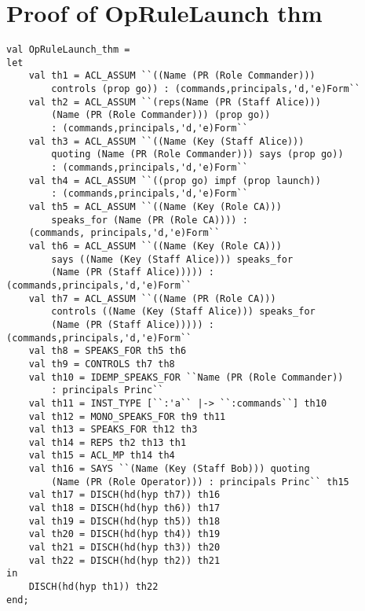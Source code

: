 \documentclass{report}
\begin{document}
\section{Proof of OpRuleLaunch thm}
\label{proof-14-4-1-A}
\begin{lstlisting}[frame=TBlr]
val OpRuleLaunch_thm =
let
	val th1 = ACL_ASSUM ``((Name (PR (Role Commander))) 
        controls (prop go)) : (commands,principals,'d,'e)Form``
	val th2 = ACL_ASSUM ``(reps(Name (PR (Staff Alice))) 
        (Name (PR (Role Commander))) (prop go)) 
        : (commands,principals,'d,'e)Form``
	val th3 = ACL_ASSUM ``((Name (Key (Staff Alice))) 
        quoting (Name (PR (Role Commander))) says (prop go)) 
        : (commands,principals,'d,'e)Form``
	val th4 = ACL_ASSUM ``((prop go) impf (prop launch)) 
        : (commands,principals,'d,'e)Form``
	val th5 = ACL_ASSUM ``((Name (Key (Role CA))) 
        speaks_for (Name (PR (Role CA)))) :
	(commands, principals,'d,'e)Form``
	val th6 = ACL_ASSUM ``((Name (Key (Role CA))) 
        says ((Name (Key (Staff Alice))) speaks_for 
        (Name (PR (Staff Alice))))) : (commands,principals,'d,'e)Form``
	val th7 = ACL_ASSUM ``((Name (PR (Role CA))) 
        controls ((Name (Key (Staff Alice))) speaks_for 
        (Name (PR (Staff Alice))))) : (commands,principals,'d,'e)Form``
	val th8 = SPEAKS_FOR th5 th6
	val th9 = CONTROLS th7 th8
	val th10 = IDEMP_SPEAKS_FOR ``Name (PR (Role Commander)) 
        : principals Princ``
	val th11 = INST_TYPE [``:'a`` |-> ``:commands``] th10
	val th12 = MONO_SPEAKS_FOR th9 th11
	val th13 = SPEAKS_FOR th12 th3
	val th14 = REPS th2 th13 th1
	val th15 = ACL_MP th14 th4
	val th16 = SAYS ``(Name (Key (Staff Bob))) quoting 
        (Name (PR (Role Operator))) : principals Princ`` th15
	val th17 = DISCH(hd(hyp th7)) th16
	val th18 = DISCH(hd(hyp th6)) th17
	val th19 = DISCH(hd(hyp th5)) th18
	val th20 = DISCH(hd(hyp th4)) th19
	val th21 = DISCH(hd(hyp th3)) th20
	val th22 = DISCH(hd(hyp th2)) th21
in
	DISCH(hd(hyp th1)) th22
end;
\end{lstlisting}
\end{document}
